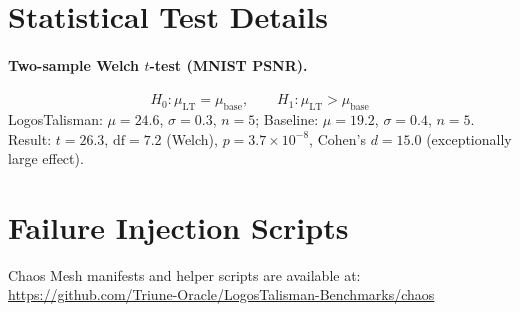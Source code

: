 \documentclass{article}
\begin{document}
\section{Statistical Test Details}
\label{app:stats}

\paragraph{Two-sample Welch $t$-test (MNIST PSNR).}
\[
  H_0: \mu_{\mathrm{LT}} = \mu_{\mathrm{base}}, \qquad
  H_1: \mu_{\mathrm{LT}} > \mu_{\mathrm{base}}
\]
LogosTalisman: $\mu{=}24.6$, $\sigma{=}0.3$, $n{=}5$;
Baseline: $\mu{=}19.2$, $\sigma{=}0.4$, $n{=}5$.
Result: $t{=}26.3$, $\mathrm{df}{=}7.2$ (Welch), $p{=}3.7{\times}10^{-8}$,
Cohen's $d{=}15.0$ (exceptionally large effect).

\section{Failure Injection Scripts}
\label{app:chaos}

Chaos Mesh manifests and helper scripts are available at:\\
\url{https://github.com/Triune-Oracle/LogosTalisman-Benchmarks/chaos}
\end{document}
